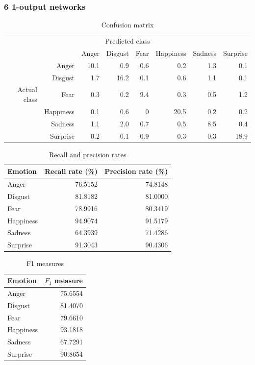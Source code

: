 \documentclass[12pt]{article}
\begin{document}
\subsubsection*{6 1-output networks}

\begin{table}
\centering
\begin{tabular}{r r | r r r r r r}
\multicolumn{8}{c}{Predicted class} \\
&  & Anger & Disgust & Fear & Happiness & Sadness & Surprise \\
\hline
 & Anger            & 10.1 & 0.9  & 0.6 & 0.2  & 1.3 & 0.1  \\
 & Disgust          & 1.7  & 16.2 & 0.1 & 0.6  & 1.1 & 0.1  \\
Actual class & Fear & 0.3  & 0.2  & 9.4 & 0.3  & 0.5 & 1.2  \\
 & Happiness        & 0.1  & 0.6  & 0   & 20.5 & 0.2 & 0.2  \\
 & Sadness          & 1.1  & 2.0  & 0.7 & 0.5  & 8.5 & 0.4  \\
 & Surprise         & 0.2  & 0.1  & 0.9 & 0.3  & 0.3 & 18.9 \\
\end{tabular}
\caption{Confusion matrix}
\end{table}

\begin{table}
\centering
\begin{tabular}{l | r r}
Emotion & Recall rate (\%) & Precision rate (\%) \\
\hline
Anger     & 76.5152 & 74.8148 \\
Disgust   & 81.8182 & 81.0000 \\
Fear      & 78.9916 & 80.3419 \\
Happiness & 94.9074 & 91.5179 \\
Sadness   & 64.3939 & 71.4286 \\
Surprise  & 91.3043 & 90.4306 \\
\end{tabular}
\caption{Recall and precision rates}
\end{table}

\begin{table}
\centering
\begin{tabular}{l | r}
Emotion & \( F_1 \) measure \\
\hline
Anger     & 75.6554 \\
Disgust   & 81.4070 \\
Fear      & 79.6610 \\
Happiness & 93.1818 \\
Sadness   & 67.7291 \\
Surprise  & 90.8654 \\
\end{tabular}
\caption{F1 measures}
\end{table}
\end{document}
